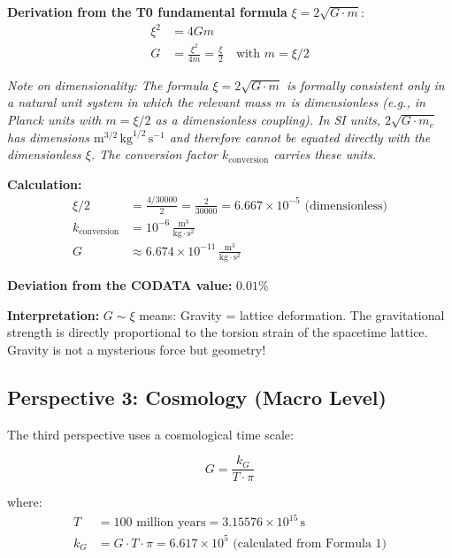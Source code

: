	\textbf{Derivation from the T0 fundamental formula} \(\xi = 2\sqrt{G \cdot m}\):
	\begin{align}
		\xi^2 &= 4Gm \\
		G &= \frac{\xi^2}{4m} = \frac{\xi}{2} \quad \text{with } m = \xi/2
	\end{align}
	
	\textit{Note on dimensionality: The formula $\xi = 2\sqrt{G \cdot m}$ is formally consistent only in a natural unit system in which the relevant mass $m$ is dimensionless (e.g., in Planck units with $m = \xi/2$ as a dimensionless coupling). In SI units, $2\sqrt{G \cdot m_e}$ has dimensions $\text{m}^{3/2}\,\text{kg}^{1/2}\,\text{s}^{-1}$ and therefore cannot be equated directly with the dimensionless $\xi$. The conversion factor $k_{\text{conversion}}$ carries these units.}
	
	\textbf{Calculation:}
	\begin{align}
		\xi/2 &= \frac{4/30000}{2} = \frac{2}{30000} = 6.667 \times 10^{-5} \text{ (dimensionless)} \\
		k_{\text{conversion}} &= 10^{-6}\,\frac{\text{m}^3}{\text{kg} \cdot \text{s}^2} \\
		G &\approx 6.674 \times 10^{-11}\,\frac{\text{m}^3}{\text{kg} \cdot \text{s}^2}
	\end{align}
	
	\textbf{Deviation from the CODATA value:} \(0.01\%\)
	
	\textbf{Interpretation:} \(G \sim \xi\) means: Gravity = lattice deformation. The gravitational strength is directly proportional to the torsion strain of the spacetime lattice. Gravity is not a mysterious force but geometry!
	
	\subsection{Perspective 3: Cosmology (Macro Level)}
	
	The third perspective uses a cosmological time scale:
	
	\begin{equation}
		\boxed{G = \frac{k_G}{T \cdot \pi}}
	\end{equation}
	
	where:
	\begin{align}
		T &= 100 \text{ million years} = 3.15576 \times 10^{15}\,\text{s} \\
		k_G &= G \cdot T \cdot \pi = 6.617 \times 10^5 \text{ (calculated from Formula 1)}
	\end{align}
	
